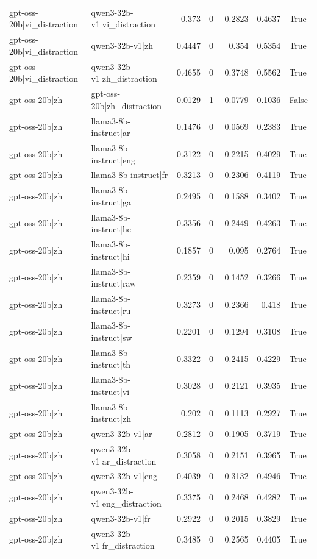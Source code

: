 \begin{table}
\begin{tabular}{l l r r r r l}
gpt-oss-20b|vi_distraction & qwen3-32b-v1|vi_distraction & 0.373 & 0 & 0.2823 & 0.4637 & True \\
gpt-oss-20b|vi_distraction & qwen3-32b-v1|zh & 0.4447 & 0 & 0.354 & 0.5354 & True \\
gpt-oss-20b|vi_distraction & qwen3-32b-v1|zh_distraction & 0.4655 & 0 & 0.3748 & 0.5562 & True \\
gpt-oss-20b|zh & gpt-oss-20b|zh_distraction & 0.0129 & 1 & -0.0779 & 0.1036 & False \\
gpt-oss-20b|zh & llama3-8b-instruct|ar & 0.1476 & 0 & 0.0569 & 0.2383 & True \\
gpt-oss-20b|zh & llama3-8b-instruct|eng & 0.3122 & 0 & 0.2215 & 0.4029 & True \\
gpt-oss-20b|zh & llama3-8b-instruct|fr & 0.3213 & 0 & 0.2306 & 0.4119 & True \\
gpt-oss-20b|zh & llama3-8b-instruct|ga & 0.2495 & 0 & 0.1588 & 0.3402 & True \\
gpt-oss-20b|zh & llama3-8b-instruct|he & 0.3356 & 0 & 0.2449 & 0.4263 & True \\
gpt-oss-20b|zh & llama3-8b-instruct|hi & 0.1857 & 0 & 0.095 & 0.2764 & True \\
gpt-oss-20b|zh & llama3-8b-instruct|raw & 0.2359 & 0 & 0.1452 & 0.3266 & True \\
gpt-oss-20b|zh & llama3-8b-instruct|ru & 0.3273 & 0 & 0.2366 & 0.418 & True \\
gpt-oss-20b|zh & llama3-8b-instruct|sw & 0.2201 & 0 & 0.1294 & 0.3108 & True \\
gpt-oss-20b|zh & llama3-8b-instruct|th & 0.3322 & 0 & 0.2415 & 0.4229 & True \\
gpt-oss-20b|zh & llama3-8b-instruct|vi & 0.3028 & 0 & 0.2121 & 0.3935 & True \\
gpt-oss-20b|zh & llama3-8b-instruct|zh & 0.202 & 0 & 0.1113 & 0.2927 & True \\
gpt-oss-20b|zh & qwen3-32b-v1|ar & 0.2812 & 0 & 0.1905 & 0.3719 & True \\
gpt-oss-20b|zh & qwen3-32b-v1|ar_distraction & 0.3058 & 0 & 0.2151 & 0.3965 & True \\
gpt-oss-20b|zh & qwen3-32b-v1|eng & 0.4039 & 0 & 0.3132 & 0.4946 & True \\
gpt-oss-20b|zh & qwen3-32b-v1|eng_distraction & 0.3375 & 0 & 0.2468 & 0.4282 & True \\
gpt-oss-20b|zh & qwen3-32b-v1|fr & 0.2922 & 0 & 0.2015 & 0.3829 & True \\
gpt-oss-20b|zh & qwen3-32b-v1|fr_distraction & 0.3485 & 0 & 0.2565 & 0.4405 & True \\

\end{tabular}
\end{table}

